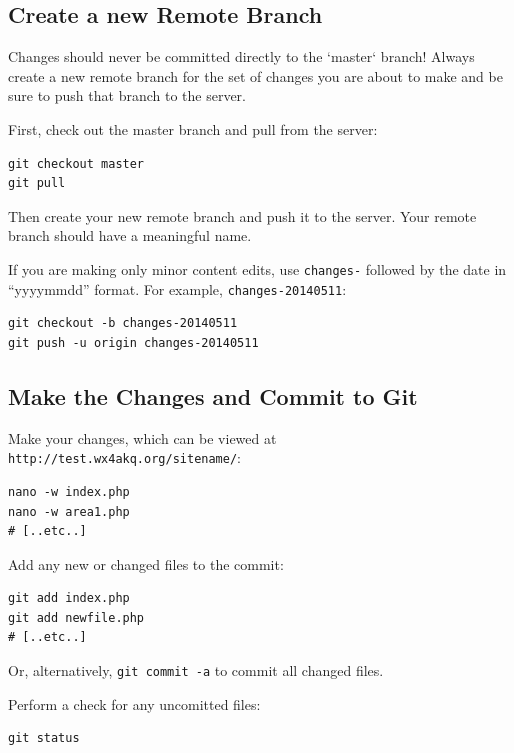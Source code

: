 \documentclass[pdflatex,letterpaper,twoside,12pt]{book}
\begin{document}
\subsection{Create a new Remote Branch}

Changes should never be committed directly to the `master` branch!  Always create a new remote branch for the set of changes you are about to make and be sure to push that branch to the server.

First, check out the master branch and pull from the server:

\begin{verbatim}
git checkout master
git pull
\end{verbatim}

Then create your new remote branch and push it to the server.  Your remote branch should have a meaningful name.

If you are making only minor content edits, use \texttt{changes-} followed by the date in ``yyyymmdd'' format.  For example, \texttt{changes-20140511}:

\begin{verbatim}
git checkout -b changes-20140511
git push -u origin changes-20140511
\end{verbatim}

\subsection{Make the Changes and Commit to Git}

Make your changes, which can be viewed at \texttt{http://test.wx4akq.org/sitename/}:

\begin{verbatim}
nano -w index.php
nano -w area1.php
# [..etc..]
\end{verbatim}

Add any new or changed files to the commit:

\begin{verbatim}
git add index.php
git add newfile.php
# [..etc..]
\end{verbatim}

Or, alternatively, \texttt{git commit -a} to commit all changed files.

Perform a check for any uncomitted files:

\begin{verbatim}
git status
\end{verbatim}
\end{document}
